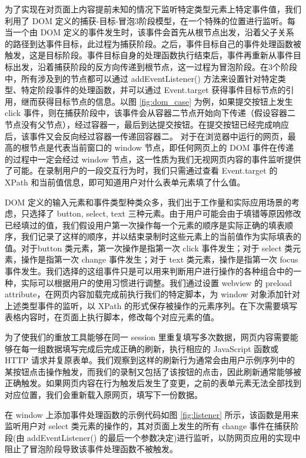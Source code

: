 \documentclass[design, pageheader]{njubachelor}
\begin{document}
为了实现在对页面上内容提前未知的情况下监听特定类型元素上特定事件值，我们利用了 DOM 定义的捕获-目标-冒泡3阶段模型，在一个特殊的位置进行监听。每当一个由 DOM 定义的事件发生时，该事件会首先从根节点出发，沿着父子关系的路径到达事件目标，此过程为捕获阶段。之后，事件目标自己的事件处理函数被触发，这是目标阶段。事件目标自身的处理函数执行结束后，事件再重新从事件目标出发，沿着捕获阶段的反方向传递到根节点，这一过程为冒泡阶段。在3个阶段中，所有涉及到的节点都可以通过 addEventListener() 方法来设置针对特定类型、特定阶段事件的处理函数，并可以通过 Event.target 获得事件目标节点的引用，继而获得目标节点的信息。以图 \ref{fig:dom_case} 为例，如果提交按钮上发生 click 事件，则在捕获阶段中，该事件会从容器二节点开始向下传递（假设容器二节点没有父节点），经过容器一，最后到达提交按钮。在提交按钮已经完成响应后，该事件又会反向经过容器一传递回容器二。 对于在浏览器中运行的网页，最高的根节点是代表当前窗口的 window 节点，即任何网页上的 DOM 事件在传递的过程中一定会经过 window 节点，这一性质为我们无视网页内容的事件监听提供了可能。在录制用户的一段交互行为时，我们只需通过查看 Event.target 的 XPath 和当前值信息，即可知道用户对什么表单元素填了什么值。

DOM 定义的输入元素和事件类型种类众多，我们出于工作量和实际应用场景的考虑，只选择了 
button, select, text 三种元素。由于用户可能会由于填错等原因修改已经填过的值，我们假设用户第一次操作每一个元素的顺序是实际正确的填表顺序，我们记录了这样的顺序，并以结束录制时这些元素上的当前值作为实际填表的值。对于button 类元素，第一次操作是指第一次 click 事件发生；对于 select 类元素，操作是指第一次 change 事件发生；对于 text 类元素，操作是指第一次 focus 事件发生。我们选择的这组事件只是可以用来判断用户进行操作的各种组合中的一种，实际可以根据用户的使用习惯进行调整。我们通过设置 webview 的 preload attribute，在网页内容加载完成前执行我们的特定脚本，为 window 对象添加针对上述类型事件的监听，以 XPath 的形式保存被操作的元素序列。在下次需要填写表格内容时，在页面上执行脚本，修改每个对应元素的值。

为了使我们的重放工具能够在同一 session 里重复填写多次数据，网页内容需要能够在每一组数据填写完成后完成正确的刷新，执行相应的 JavaScript 函数或 HTTP 请求并复原表单。我们观察到这样的刷新行为通常会由用户示例序列中的某按钮点击操作触发，而我们的录制又包括了该按钮的点击，因此刷新通常能够被正确触发。如果网页内容在行为触发后发生了变更，之前的表单元素无法全部找到对应位置，我们会重新载入原网页，填写下一份数据。

在 window 上添加事件处理函数的示例代码如图 \ref{fig:listener} 所示，该函数是用来监听用户对 select 类元素的操作的，其对页面上发生的所有 change 事件在捕获阶段(由 addEventListener() 的最后一个参数决定)进行监听，以防网页应用的实现中阻止了冒泡阶段导致该事件处理函数不被触发。
\end{document}
